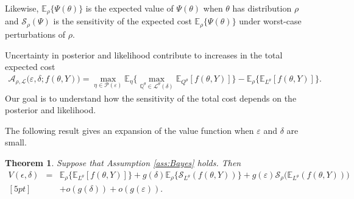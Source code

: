 \documentclass[11pt,reqno,letter]{amsart}
\theoremstyle{plain}
\newtheorem{theorem}{Theorem}[section]
\theoremstyle{definition}
\numberwithin{equation}{section}
\numberwithin{theorem}{section}
\numberwithin{table}{section}
\numberwithin{figure}{section}
\begin{document}
Likewise, ${\mathbb E}_\rho \big\{\Psi(\theta) \big\}$ is the expected value of $\Psi(\theta)$ when $\theta$ has distribution $\rho$ and
${\mathcal S}_{\rho}(\Psi)$ is the sensitivity of the expected cost ${\mathbb E}_\rho \big\{\Psi(\theta) \big\}$ under worst-case perturbations of $\rho$. 
   
Uncertainty in posterior and likelihood contribute to increases in the total expected cost
   \begin{eqnarray*}
   {\mathcal A}_{\rho,{\mathcal L}}\big(\varepsilon, \delta; f(\theta, Y)\big) = \max_{\eta \in {\mathcal P}(\varepsilon)} {\mathbb E}_\eta \Big\{\max_{{\mathbb Q}^\theta \in {\mathcal L}^\theta(\delta)} {\mathbb E}_{Q^\theta} [f(\theta, Y)] \Big\} - {\mathbb E}_\rho \Big\{{\mathbb E}_{L^\theta}[f(\theta, Y)]  \Big\}.
   \end{eqnarray*}
Our goal is to understand how the sensitivity of the total cost depends on the posterior and likelihood.

The following result gives an expansion of the value function when $\varepsilon$ and $\delta$ are small. 
\begin{theorem} \label{prop:Bayesian expansion}
Suppose that Assumption \ref{ass:Bayes} holds. Then
\begin{eqnarray*}
V(\epsilon, \delta) & = & 
{\mathbb E}_\rho\Big\{{\mathbb E}_{L^\theta}[f(\theta, Y)] \Big\} + g(\delta){\mathbb E}_\rho\Big\{{\mathcal S}_{L^\theta}(f(\theta, Y))\Big\}  +  g(\varepsilon) {\mathcal S}_\rho\Big({\mathbb E}_{L^\theta}(f(\theta, Y))\Big) \\ [5pt] 
& & + o(g(\delta)) + o(g({\varepsilon})).
\end{eqnarray*}
\end{theorem}
\end{document}
